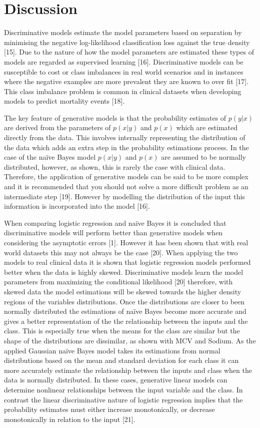 \documentclass[a4paper,UKenglish]{oasics-v2016}
\begin{document}
\section{Discussion}

Discriminative models estimate the model parameters based on separation by minimising the negative log-likelihood classification loss against the true density [15]. Due to the nature of how the model parameters are estimated these types of models are regarded as supervised learning [16]. Discriminative models can be susceptible to cost or class imbalances in real world scenarios and in instances where the negative examples are more prevalent they are known to over fit [17]. This class imbalance problem is common in clinical datasets when developing models to predict mortality events [18]. 

The key feature of generative models is that the probability estimates of $p(y|x)$ are derived from the parameters of $p(x|y)$ and $p(x)$ which are estimated directly from the data. This involves internally representing the distribution of the data which adds an extra step in the probability estimations process. In the case of the naïve Bayes model $p(x|y)$ and $p(x)$ are assumed to be normally distributed, however, as shown, this is rarely the case with clinical data. Therefore, the application of generative models can be said to be more complex and it is recommended that you should not solve a more difficult problem as an intermediate step [19]. However by modelling the distribution of the input this information is incorporated into the model [16].

When comparing logistic regression and naïve Bayes it is concluded that discriminative models will perform better than generative models when considering the asymptotic errors [1]. However it has been shown that with real world datasets this may not always be the case [20]. When applying the two models to real clinical data it is shown that logistic regression models performed better when the data is highly skewed. Discriminative models learn the model parameters from maximizing the conditional likelihood [20] therefore, with skewed data the model estimations will be skewed towards the higher density regions of the variables distributions. Once the distributions are closer to been normally distributed the estimations of naïve Bayes become more accurate and gives a better representation of the the relationship between the inputs and the class. This is especially true when the means for the class are similar but the shape of the distributions are dissimilar, as shown with MCV and Sodium. As the applied Gaussian naïve Bayes model takes its estimations from normal distributions based on the mean and standard deviation for each class it can more accurately estimate the relationship between the inputs and class when the data is normally distributed. In these cases, generative linear models can determine nonlinear relationships between the input variable and the class. In contrast the linear discriminative nature of logistic regression implies that the probability estimates must either increase monotonically, or decrease monotonically in relation to the input [21].
\end{document}
